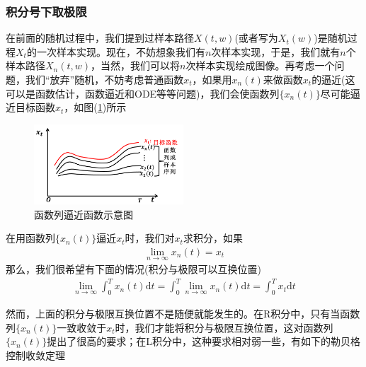         \subsubsection{积分号下取极限}
            \label{subsubsec:积分号下取极限}
            \par
            在前面的随机过程中，我们提到过样本路径$X(t,w)$(或者写为$X_t(w)$)是随机过程$X_t$的一次样本实现。现在，不妨想象我们有$n$次样本实现，于是，我们就有$n$个样本路径$X_n(t,w)$，当然，我们可以将$n$次样本实现绘成图像。再考虑一个问题，我们“放弃”随机，不妨考虑普通函数$x_t$，如果用$x_n(t)$来做函数$x_t$的逼近(这可以是函数估计，函数逼近和ODE等等问题)，我们会使函数列$\{x_n(t)\}$尽可能逼近目标函数$x_t$，如图(\ref{fig:函数列逼近函数示意图})所示
            \begin{figure}[H]
                \centering
                \includegraphics[height=3cm]{images/func_to_func.jpg}
                \caption{函数列逼近函数示意图}
                \label{fig:函数列逼近函数示意图}
            \end{figure}
            \par
            在用函数列$\{x_n(t)\}$逼近$x_t$时，我们对$x_t$求积分，如果
            \begin{align*}
                \lim_{n \rightarrow \infty} x_n(t) = x_t
            \end{align*}
            那么，我们很希望有下面的情况(积分与极限可以互换位置)
            \begin{align*}
                \lim_{n \rightarrow \infty} \int_0^T x_n(t) \mathrm{d}t = \int_0^T \lim_{n \rightarrow \infty}x_n(t) \mathrm{d}t = \int_0^T x_t \mathrm{d}t
            \end{align*}
            \par
            然而，上面的积分与极限互换位置不是随便就能发生的。在R积分中，只有当函数列$\{x_n(t)\}$一致收敛于$x_t$时，我们才能将积分与极限互换位置，这对函数列$\{x_n(t)\}$提出了很高的要求；在L积分中，这种要求相对弱一些，有如下的勒贝格控制收敛定理
